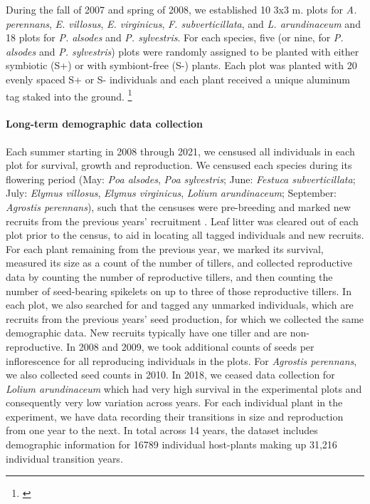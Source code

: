 \documentclass[12pt]{article}
\newcommand{\josh}[2]{{\color{blue}{#1}}\footnote{\textit{\color{blue}{#2}}}}
\begin{document}
During the fall of 2007 and spring of 2008, we established 10 3x3 m. plots for \emph{A. perennans}, \emph{E. villosus}, \emph{E. virginicus}, \emph{F. subverticillata}, and \emph{L. arundinaceum}  and 18 plots for \emph{P. alsodes} and \emph{P. sylvestris}.
For each species, five (or nine, for \emph{P. alsodes} and \emph{P. sylvestris}) plots were randomly assigned to be planted with either symbiotic (S+) or with symbiont-free (S-) plants.
Each plot was planted with 20 evenly spaced S+ or S- individuals and each plant received a unique aluminum tag staked into the ground. 
\josh{In XXXX, we placed fencing around each plot to limit herbivory and disturbance in the plots, and replaced fencing for all plots in XXXX.}{}

\paragraph*{Long-term demographic data collection}
Each summer starting in 2008 through 2021, we censused all individuals in each plot for survival, growth and reproduction. 
We censused each species during its flowering period (May: \emph{Poa alsodes}, \emph{Poa sylvestris}; June: \emph{Festuca subverticillata}; July: \emph{Elymus villosus}, \emph{Elymus virginicus}, \emph{Lolium arundinaceum}; September: \emph{Agrostis perennans}), such that the censuses were pre-breeding and marked new recruits from the previous years' recruitment .
Leaf litter was cleared out of each plot prior to the census, to aid in locating all tagged individuals and new recruits.
For each plant remaining from the previous year, we marked its survival, measured its size as a count of the number of tillers, and collected reproductive data by counting the number of reproductive tillers, and then counting the number of seed-bearing spikelets on up to three of those reproductive tillers. 
In each plot, we also searched for and tagged any unmarked individuals, which are recruits from the previous years' seed production, for which we collected the same demographic data.
New recruits typically have one tiller and are non-reproductive. 
In 2008 and 2009, we took additional counts of seeds per inflorescence for all reproducing individuals in the plots. 
For \emph{Agrostis perennans}, we also collected seed counts in 2010.
In 2018, we ceased data collection  for \emph{Lolium arundinaceum} which had very high survival in the experimental plots and consequently very low variation across years.
For each individual plant in the experiment, we have data recording their transitions in size and reproduction from one year to the next. 
In total across 14 years, the dataset includes demographic information for 16789 individual host-plants making up 31,216 individual transition years.
\end{document}
